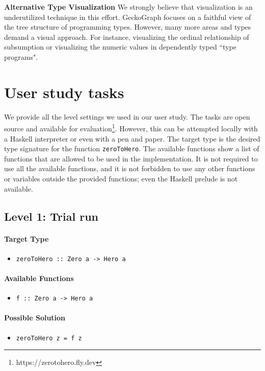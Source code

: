 \documentclass[preprint,12pt]{elsarticle}
\begin{document}
\noindent\textbf{Alternative Type Visualization}
We strongly believe that visualization is an underutilized technique in this effort. GeckoGraph focuses on a faithful view of the tree structure of programming types. However, many more areas and types demand a visual approach. For instance, visualizing the ordinal relationship of subsumption or visualizing the numeric values in dependently typed ``type programs". 

 


\appendix
\section{User study tasks} \label{levels}
We provide all the level settings we used in our user study. The tasks are open source and available for evaluation\footnote{https://zerotohero.fly.dev}. However, this can be attempted locally with a Haskell interpreter or even with a pen and paper. The target type is the desired type signature for the function \texttt{zeroToHero}. The available functions show a list of functions that are allowed to be used in the implementation. It is not required to use all the available functions, and it is not forbidden to use any other functions or variables outside the provided functions; even the Haskell prelude is not available. 


\subsection{Level 1: Trial run}

\paragraph{Target Type } 
\begin{itemize}
    \item \texttt{zeroToHero :: Zero a -> Hero a}
\end{itemize}

\paragraph{Available Functions} 
\begin{itemize}
    \item \texttt{f :: Zero a -> Hero a}
\end{itemize}

\paragraph{Possible Solution} 
\begin{itemize}
    \item \texttt{zeroToHero z = f z}
\end{itemize}
\end{document}
